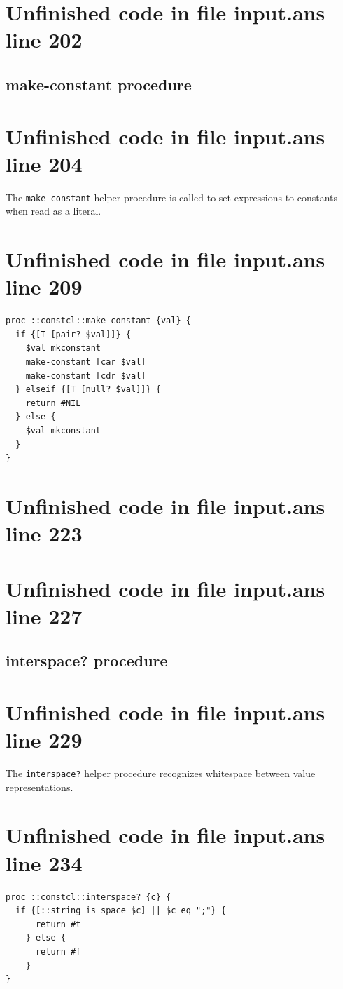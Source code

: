 \documentclass[twoside,9pt]{report}
\begin{document}
\section{Unfinished code in file input.ans line 202}
\subsection{make-constant procedure}
\label{make-constant-procedure}
\section{Unfinished code in file input.ans line 204}


The \texttt{make-constant} helper procedure is called to set expressions to constants when read as a literal.

\section{Unfinished code in file input.ans line 209}
\begin{lstlisting}
proc ::constcl::make-constant {val} {
  if {[T [pair? $val]]} {
    $val mkconstant
    make-constant [car $val]
    make-constant [cdr $val]
  } elseif {[T [null? $val]]} {
    return #NIL
  } else {
    $val mkconstant
  }
}
\end{lstlisting}
\section{Unfinished code in file input.ans line 223}
\section{Unfinished code in file input.ans line 227}
\subsection{interspace? procedure}
\label{interspace?-procedure}
\section{Unfinished code in file input.ans line 229}


The \texttt{interspace?} helper procedure recognizes whitespace between value representations.

\section{Unfinished code in file input.ans line 234}
\begin{lstlisting}
proc ::constcl::interspace? {c} {
  if {[::string is space $c] || $c eq ";"} {
      return #t
    } else {
      return #f
    }
}
\end{lstlisting}
\end{document}
